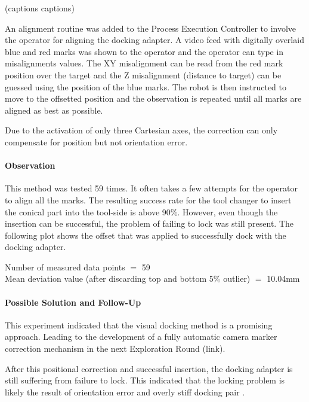 





(captions captions)

An alignment routine was added to the Process Execution Controller to involve the operator for aligning the docking adapter. A video feed with digitally overlaid blue and red marks was shown to the operator and the operator can type in misalignments values. The XY misalignment can be read from the red mark position over the target and the Z misalignment (distance to target) can be guessed using the position of the blue marks. The robot is then instructed to move to the offsetted position and the observation is repeated until all marks are aligned as best as possible. 

Due to the activation of only three Cartesian axes, the correction can only compensate for position but not orientation error. 

\paragraph{Observation}

This method was tested 59 times.  It often takes a few attempts for the operator to align all the marks. The resulting success rate for the tool changer to insert the conical part into the tool-side is above 90$\%$. However, even though the insertion can be successful, the problem of failing to lock was still present. The following plot shows the offset that was applied to successfully dock with the docking adapter.



{\footnotesize Number of measured data points $=$ 59 \\ Mean deviation value (after discarding top and bottom 5$\%$ outlier) $=$ 10.04mm\par}

\paragraph{Possible Solution and Follow-Up}

This experiment indicated that the visual docking method is a promising approach. Leading to the development of a fully automatic camera marker correction mechanism in the next Exploration Round (link). 

After this positional correction and successful insertion, the docking adapter is still suffering from failure to lock. This indicated that the locking problem is likely the result of orientation error and overly stiff docking pair .

